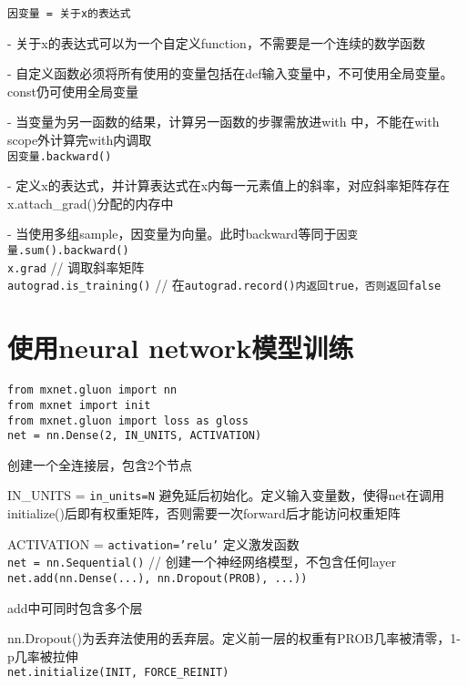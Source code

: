\documentclass[UTF8]{ctexart}
\begin{document}
  \texttt{因变量 = 关于x的表达式}
  
  - 关于x的表达式可以为一个自定义function，不需要是一个连续的数学函数
  
  - 自定义函数必须将所有使用的变量包括在def输入变量中，不可使用全局变量。const仍可使用全局变量
  
  - 当变量为另一函数的结果，计算另一函数的步骤需放进with 中，不能在with scope外计算完with内调取\\
\texttt{因变量.backward()}
  
  - 定义x的表达式，并计算表达式在x内每一元素值上的斜率，对应斜率矩阵存在x.attach\_grad()分配的内存中
  
  - 当使用多组sample，因变量为向量。此时backward等同于\texttt{因变量.sum().backward()}\\
\texttt{x.grad} // 调取斜率矩阵\\
\texttt{autograd.is\_training()} // 在\texttt{autograd.record()内返回true，否则返回false}

\section{使用neural network模型训练}

\noindent \texttt{from mxnet.gluon import nn}\\
\texttt{from mxnet import init}\\
\texttt{from mxnet.gluon import loss as gloss}\\
\texttt{net = nn.Dense(2, IN\_UNITS, ACTIVATION)}

  创建一个全连接层，包含2个节点

  IN\_UNITS = \texttt{in\_units=N} 避免延后初始化。定义输入变量数，使得net在调用initialize()后即有权重矩阵，否则需要一次forward后才能访问权重矩阵
  
  ACTIVATION = \texttt{activation='relu'} 定义激发函数\\
\texttt{net = nn.Sequential()} // 创建一个神经网络模型，不包含任何layer\\
\texttt{net.add(nn.Dense(...), nn.Dropout(PROB), ...))}

  add中可同时包含多个层
  
  nn.Dropout()为丢弃法使用的丢弃层。定义前一层的权重有PROB几率被清零，1-p几率被拉伸\\
\texttt{net.initialize(INIT, FORCE\_REINIT)} 
\end{document}
